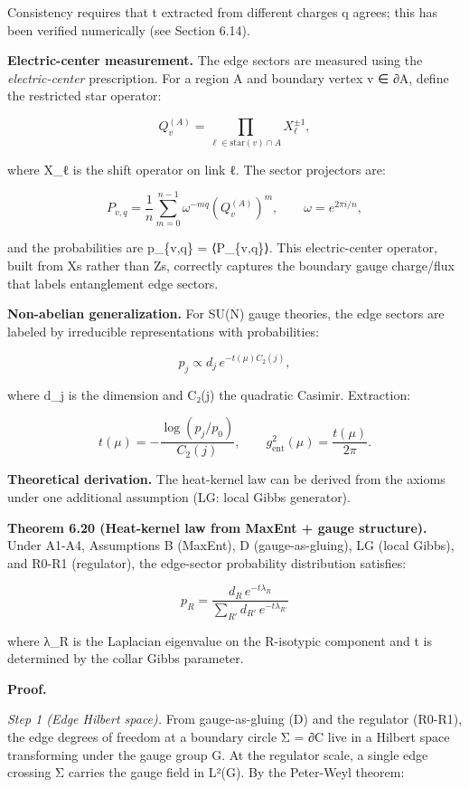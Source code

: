 Consistency requires that t extracted from different charges q agrees; this has been verified numerically (see Section 6.14).

\textbf{Electric-center measurement.} The edge sectors are measured using the \emph{electric-center} prescription. For a region A and boundary vertex v ∈ ∂A, define the restricted star operator:

\[
Q_v^{(A)} = \prod_{\ell \in \mathrm{star}(v) \cap A} X_\ell^{\pm 1},
\]

where X\_ℓ is the shift operator on link ℓ. The sector projectors are:

\[
P_{v,q} = \frac{1}{n} \sum_{m=0}^{n-1} \omega^{-mq} \left(Q_v^{(A)}\right)^m,
\qquad \omega = e^{2\pi i/n},
\]

and the probabilities are p\_\{v,q\} = ⟨P\_\{v,q\}⟩. This electric-center operator, built from X\textquotesingle s rather than Z\textquotesingle s, correctly captures the boundary gauge charge/flux that labels entanglement edge sectors.

\textbf{Non-abelian generalization.} For SU(N) gauge theories, the edge sectors are labeled by irreducible representations with probabilities:

\[
p_j \propto d_j \, e^{-t(\mu) C_2(j)},
\]

where d\_j is the dimension and C₂(j) the quadratic Casimir. Extraction:

\[
t(\mu) = -\frac{\log(p_j/p_0)}{C_2(j)}, \qquad
g_{\mathrm{ent}}^2(\mu) = \frac{t(\mu)}{2\pi}.
\]

\textbf{Theoretical derivation.} The heat-kernel law can be derived from the axioms under one additional assumption (LG: local Gibbs generator).

\textbf{Theorem 6.20 (Heat-kernel law from MaxEnt + gauge structure).} Under A1-A4, Assumptions B (MaxEnt), D (gauge-as-gluing), LG (local Gibbs), and R0-R1 (regulator), the edge-sector probability distribution satisfies:

\[
p_R = \frac{d_R \, e^{-t \lambda_R}}{\sum_{R'} d_{R'} \, e^{-t \lambda_{R'}}}
\]

where λ\_R is the Laplacian eigenvalue on the R-isotypic component and t is determined by the collar Gibbs parameter.

\textbf{Proof.}

\emph{Step 1 (Edge Hilbert space).} From gauge-as-gluing (D) and the regulator (R0-R1), the edge degrees of freedom at a boundary circle Σ = ∂C live in a Hilbert space transforming under the gauge group G. At the regulator scale, a single edge crossing Σ carries the gauge field in L²(G). By the Peter-Weyl theorem:


